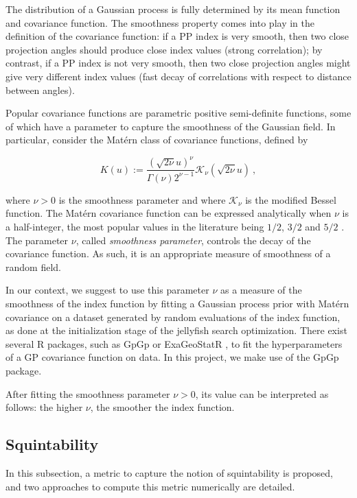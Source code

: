 \documentclass[
  number,
  preprint,
  3p]{elsarticle}
\begin{document}
The distribution of a Gaussian process is fully determined by its mean
function and covariance function. The smoothness property comes into
play in the definition of the covariance function: if a PP index is very
smooth, then two close projection angles should produce close index
values (strong correlation); by contrast, if a PP index is not very
smooth, then two close projection angles might give very different index
values (fast decay of correlations with respect to distance between
angles).

Popular covariance functions are parametric positive semi-definite
functions, some of which have a parameter to capture the smoothness of
the Gaussian field. In particular, consider the Matérn class of
covariance functions, defined by

\[
K(u):=\frac{(\sqrt{2\nu}u)^{\nu}}{\Gamma(\nu)2^{\nu-1}}\mathcal{K}_{\nu}(\sqrt{2\nu}u)\ ,
\]

where \(\nu>0\) is the smoothness parameter and where
\(\mathcal{K}_\nu\) is the modified Bessel function. The Matérn
covariance function can be expressed analytically when \(\nu\) is a
half-integer, the most popular values in the literature being \(1/2\),
\(3/2\) and \(5/2\) . The parameter \(\nu\), called \emph{smoothness
parameter}, controls the decay of the covariance function. As such, it
is an appropriate measure of smoothness of a random field.

In our context, we suggest to use this parameter \(\nu\) as a measure of
the smoothness of the index function by fitting a Gaussian process prior
with Matérn covariance on a dataset generated by random evaluations of
the index function, as done at the initialization stage of the jellyfish
search optimization. There exist several R packages, such as GpGp
\citep{guinness2021gpgp} or ExaGeoStatR \citep{abdulah2023large}, to fit
the hyperparameters of a GP covariance function on data. In this
project, we make use of the GpGp package.

After fitting the smoothness parameter \(\nu>0\), its value can be
interpreted as follows: the higher \(\nu\), the smoother the index
function.

\subsection{Squintability}\label{sec-squintability}

In this subsection, a metric to capture the notion of squintability is
proposed, and two approaches to compute this metric numerically are
detailed.
\end{document}
